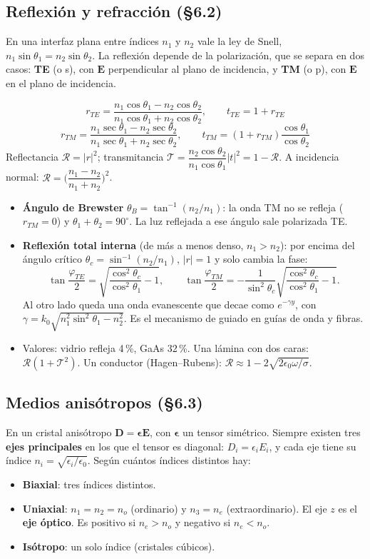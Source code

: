 \documentclass[10pt]{article}
\newcommand{\E}{\mathbf E}
\newcommand{\D}{\mathbf D}
\begin{document}
\subsection{Reflexión y refracción (§6.2)}
En una interfaz plana entre índices $n_1$ y $n_2$ vale la ley de Snell, $n_1\sin\theta_1=n_2\sin\theta_2$. La reflexión depende de la polarización, que se separa en dos casos: \textbf{TE} (o s), con $\E$ perpendicular al plano de incidencia, y \textbf{TM} (o p), con $\E$ en el plano de incidencia.

\begin{clave}[title={Ecuaciones de Fresnel (convención del Saleh)}]
\[
r_{TE}=\frac{n_1\cos\theta_1-n_2\cos\theta_2}{n_1\cos\theta_1+n_2\cos\theta_2},\qquad t_{TE}=1+r_{TE}
\]
\[
r_{TM}=\frac{n_1\sec\theta_1-n_2\sec\theta_2}{n_1\sec\theta_1+n_2\sec\theta_2},\qquad t_{TM}=(1+r_{TM})\frac{\cos\theta_1}{\cos\theta_2}
\]
Reflectancia $\mathcal R=|r|^2$; transmitancia $\mathcal T=\dfrac{n_2\cos\theta_2}{n_1\cos\theta_1}|t|^2=1-\mathcal R$. A incidencia normal: $\mathcal R=\Big(\dfrac{n_1-n_2}{n_1+n_2}\Big)^2$.
\end{clave}
\begin{itemize}
\item \textbf{Ángulo de Brewster} $\theta_B=\tan^{-1}(n_2/n_1)$: la onda TM no se refleja ($r_{TM}=0$) y $\theta_1+\theta_2=90^\circ$. La luz reflejada a ese ángulo sale polarizada TE.
\item \textbf{Reflexión total interna} (de más a menos denso, $n_1>n_2$): por encima del ángulo crítico $\theta_c=\sin^{-1}(n_2/n_1)$, $|r|=1$ y solo cambia la fase:
\[
\tan\frac{\varphi_{TE}}2=\sqrt{\frac{\cos^2\theta_c}{\cos^2\theta_1}-1},\qquad \tan\frac{\varphi_{TM}}2=-\frac{1}{\sin^2\theta_c}\sqrt{\frac{\cos^2\theta_c}{\cos^2\theta_1}-1}.
\]
Al otro lado queda una onda evanescente que decae como $e^{-\gamma y}$, con $\gamma=k_0\sqrt{n_1^2\sin^2\theta_1-n_2^2}$. Es el mecanismo de guiado en guías de onda y fibras.
\item Valores: vidrio refleja 4\,\%, GaAs 32\,\%. Una lámina con dos caras: $\mathcal R(1+\mathcal T^2)$. Un conductor (Hagen–Rubens): $\mathcal R\approx1-2\sqrt{2\epsilon_0\omega/\sigma}$.
\end{itemize}

\subsection{Medios anisótropos (§6.3)}
En un cristal anisótropo $\D=\boldsymbol\epsilon\E$, con $\boldsymbol\epsilon$ un tensor simétrico. Siempre existen tres \textbf{ejes principales} en los que el tensor es diagonal: $D_i=\epsilon_iE_i$, y cada eje tiene su índice $n_i=\sqrt{\epsilon_i/\epsilon_0}$. Según cuántos índices distintos hay:
\begin{itemize}
\item \textbf{Biaxial}: tres índices distintos.
\item \textbf{Uniaxial}: $n_1=n_2=n_o$ (ordinario) y $n_3=n_e$ (extraordinario). El eje $z$ es el \textbf{eje óptico}. Es positivo si $n_e>n_o$ y negativo si $n_e<n_o$.
\item \textbf{Isótropo}: un solo índice (cristales cúbicos).
\end{itemize}
\end{document}
